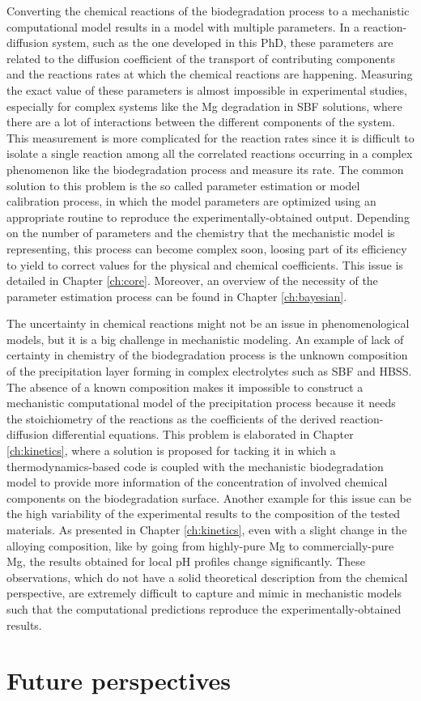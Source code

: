 Converting the chemical reactions of the biodegradation process to a mechanistic computational model results in a model with multiple parameters. In a reaction-diffusion system, such as the one developed in this PhD, these parameters are related to the diffusion coefficient of the transport of contributing components and the reactions rates at which the chemical reactions are happening. Measuring the exact value of these parameters is almost impossible in experimental studies, especially for complex systems like the Mg degradation in SBF solutions, where there are a lot of interactions between the different components of the system. This measurement is more complicated for the reaction rates since it is difficult to isolate a single reaction among all the correlated reactions occurring in a complex phenomenon like the biodegradation process and measure its rate. The common solution to this problem is the so called parameter estimation or model calibration process, in which the model parameters are optimized using an appropriate routine to reproduce the experimentally-obtained output. Depending on the number of parameters and the chemistry that the mechanistic model is representing, this process can become complex soon, loosing part of its efficiency to yield to correct values for the physical and chemical coefficients. This issue is detailed in Chapter \ref{ch:core}. Moreover, an overview of the necessity of the parameter estimation process can be found in Chapter \ref{ch:bayesian}.

The uncertainty in chemical reactions might not be an issue in phenomenological models, but it is a big challenge in mechanistic modeling. An example of lack of certainty in chemistry of the biodegradation process is the unknown composition of the precipitation layer forming in complex electrolytes such as SBF and HBSS. The absence of a known composition makes it impossible to construct a mechanistic computational model of the precipitation process because it needs the stoichiometry of the reactions as the coefficients of the derived reaction-diffusion differential equations. This problem is elaborated in Chapter \ref{ch:kinetics}, where a solution is proposed for tacking it in which a thermodynamics-based code is coupled with the mechanistic biodegradation model to provide more information of the concentration of involved chemical components on the biodegradation surface. Another example for this issue can be the high variability of the experimental results to the composition of the tested materials. As presented in Chapter \ref{ch:kinetics}, even with a slight change in the alloying composition, like by going from highly-pure Mg to commercially-pure Mg, the results obtained for local pH profiles change significantly. These observations, which do not have a solid theoretical description from the chemical perspective, are extremely difficult to capture and mimic in mechanistic models such that the computational predictions reproduce the experimentally-obtained results. 




\section{Future perspectives}



\cleardoublepage

